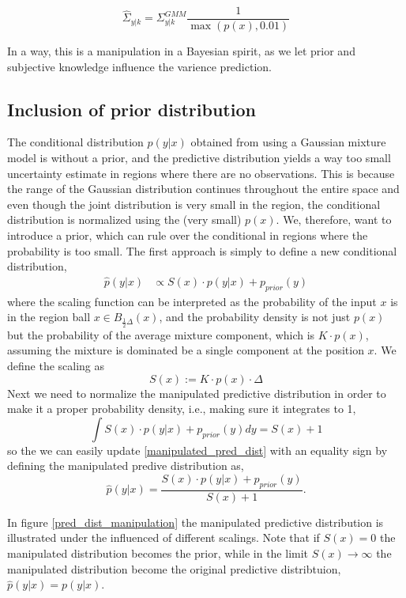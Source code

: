 $$\hat\Sigma_{y|k} =\Sigma_{y|k}^{GMM} \frac{1}{\max(p(x), 0.01)}$$

In a way, this is a manipulation in a Bayesian spirit, as we let prior and subjective knowledge influence the
varience prediction. 

\subsection{Inclusion of prior distribution}
The conditional distribution $p(y|x)$ obtained from using a Gaussian mixture model is without a prior, and
the predictive distribution yields a way too small uncertainty estimate in regions where there are no observations.
This is because the range of the Gaussian distribution continues throughout the entire space and even though the
joint distribution is very small in the region, the conditional distribution is normalized using the (very small) $p(x)$.
We, therefore, want to introduce a prior, which can rule over the conditional in regions where the probability is too
small. The first approach is simply to define a new conditional distribution, 
\begin{align}\label{manipulated_pred_dist}
    \hat p(y|x) &\propto S(x) \cdot p(y|x) + p_{prior}(y)
\end{align}
where the scaling function can be interpreted as the probability of the input $x$ is in the region
ball $x \in B_{\frac{1}{2}\Delta}(x)$, and the probability density is not just $p(x)$ but the
probability of the average mixture component, which is $K\cdot p(x)$, assuming the mixture is
dominated be a single component at the position $x$. We define the scaling as 
$$S(x):= K\cdot p(x)\cdot \Delta$$
Next we need to normalize the manipulated predictive distribution in order to
make it a proper probability density, i.e., making sure it integrates to 1, 
$$\int S(x) \cdot p(y|x) + p_{prior}(y) dy =S(x)+1$$
so the we can easily update \eqref{manipulated_pred_dist} with an equality
sign by defining the manipulated predive distribution as, 
$$\hat p(y|x) = \frac{S(x) \cdot p(y|x) + p_{prior}(y)}{S(x)+1}.$$

In figure \ref{pred_dist_manipulation} the manipulated predictive 
distribution is illustrated under the influenced of different scalings. 
Note that if $S(x) = 0$ the manipulated distribution becomes the prior,
while in the limit $S(x) \rightarrow \infty$ the manipulated distribution
become the original predictive distribtuion, $\hat p(y|x) = p(y|x)$. 

